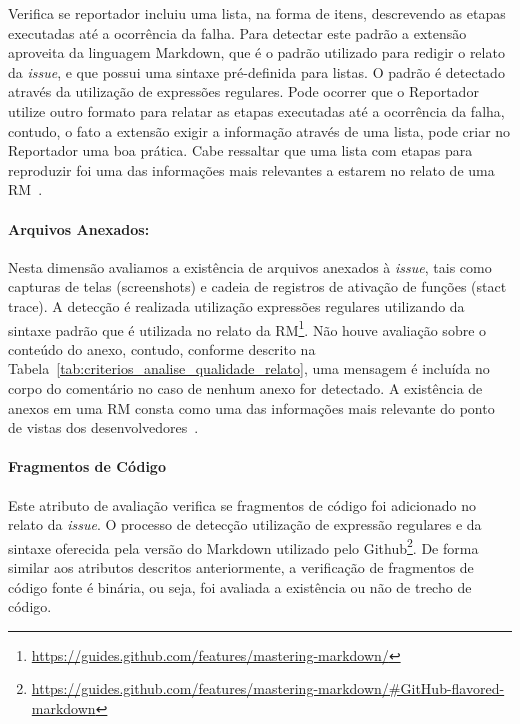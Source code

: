 Verifica se reportador incluiu uma lista, na forma de itens, descrevendo as
etapas executadas até a ocorrência da falha. Para detectar este padrão a
extensão aproveita da linguagem Markdown, que é o padrão utilizado para redigir
o relato da \textit{issue}, e que possui uma sintaxe pré-definida para listas. O
padrão é detectado através da utilização de expressões regulares. Pode ocorrer
que o Reportador utilize outro formato para relatar as etapas executadas até a
ocorrência da falha, contudo, o fato a extensão exigir a informação através de
uma lista, pode criar no Reportador uma boa prática. Cabe ressaltar que uma
lista com etapas para reproduzir foi uma das informações mais relevantes a
estarem no relato de uma RM~\cite{bettenburg2008makes}.

\paragraph{Arquivos Anexados:}
\label{par:arquivos_anexados}

Nesta dimensão avaliamos a existência de arquivos anexados à \textit{issue},
tais como capturas de telas (screenshots) e cadeia de registros de ativação de
funções (stact trace). A detecção é realizada utilização expressões regulares
utilizando da sintaxe padrão que é utilizada no relato da
RM\footnote{\url{https://guides.github.com/features/mastering-markdown/}}. Não
houve avaliação sobre o conteúdo do anexo, contudo, conforme descrito na
Tabela~\ref{tab:criterios_analise_qualidade_relato}, uma mensagem é incluída no
corpo do comentário no caso de nenhum anexo for detectado. A existência de
anexos em uma RM consta como uma das informações mais relevante do ponto de
vistas dos desenvolvedores~\cite{bettenburg2008makes}.

\paragraph{Fragmentos de Código}
\label{par:fragmentos_de_código}

Este atributo de avaliação verifica se fragmentos de código foi adicionado no
relato da \textit{issue}. O processo de detecção utilização de expressão
regulares e da sintaxe oferecida pela versão do Markdown utilizado pelo
Github\footnote{\url{https://guides.github.com/features/mastering-markdown/\#GitHub-flavored-markdown}}.
De forma similar aos atributos descritos anteriormente, a verificação de
fragmentos de código fonte é binária, ou seja, foi avaliada a existência ou não
de trecho de código.

